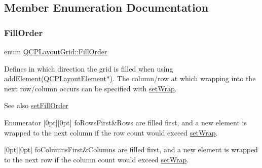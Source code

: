 \subsection{Member Enumeration Documentation}
\mbox{\label{class_q_c_p_layout_grid_a7d49ee08773de6b2fd246edfed353cca}} 
\subsubsection{\texorpdfstring{FillOrder}{FillOrder}}
{\footnotesize\ttfamily enum \mbox{\hyperlink{class_q_c_p_layout_grid_a7d49ee08773de6b2fd246edfed353cca}{Q\+C\+P\+Layout\+Grid\+::\+Fill\+Order}}}

Defines in which direction the grid is filled when using \mbox{\hyperlink{class_q_c_p_layout_grid_a4c44025dd25acd27e053cadfd448ad7b}{add\+Element(\+Q\+C\+P\+Layout\+Element$\ast$)}}. The column/row at which wrapping into the next row/column occurs can be specified with \mbox{\hyperlink{class_q_c_p_layout_grid_ab36af18d77e4428386d02970382ee598}{set\+Wrap}}.

\begin{DoxySeeAlso}{See also}
\mbox{\hyperlink{class_q_c_p_layout_grid_affc2f3cfd22f28698c5b29b960d2a391}{set\+Fill\+Order}} 
\end{DoxySeeAlso}
\begin{DoxyEnumFields}{Enumerator}
[0pt][0pt]{}\mbox{\label{class_q_c_p_layout_grid_a7d49ee08773de6b2fd246edfed353ccaa0202730954e26c474cc820164aedce3e}} 
fo\+Rows\+First&Rows are filled first, and a new element is wrapped to the next column if the row count would exceed \mbox{\hyperlink{class_q_c_p_layout_grid_ab36af18d77e4428386d02970382ee598}{set\+Wrap}}. \\
\hline

[0pt][0pt]{}\mbox{\label{class_q_c_p_layout_grid_a7d49ee08773de6b2fd246edfed353ccaac4cb4b796ec4822d5894b47b51627fb3}} 
fo\+Columns\+First&Columns are filled first, and a new element is wrapped to the next row if the column count would exceed \mbox{\hyperlink{class_q_c_p_layout_grid_ab36af18d77e4428386d02970382ee598}{set\+Wrap}}. \\
\hline

\end{DoxyEnumFields}


